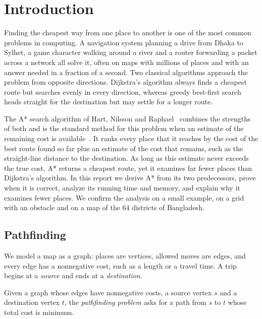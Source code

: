\section{Introduction}\label{sec:intro}

Finding the cheapest way from one place to another is one of the most common
problems in computing. A navigation system planning a drive from Dhaka to
Sylhet, a game character walking around a river and a router forwarding a
packet across a network all solve it, often on maps with millions of places and
with an answer needed in a fraction of a second. Two classical algorithms
approach the problem from opposite directions. Dijkstra's algorithm always finds
a cheapest route but searches evenly in every direction, whereas greedy
best-first search heads straight for the destination but may settle for a
longer route.

The A* search algorithm of Hart, Nilsson and Raphael~\cite{hart1968formal}
combines the strengths of both and is the standard method for this problem when
an estimate of the remaining cost is available~\cite{russell2020aima}. It ranks
every place that it reaches by the cost of the best route found so far plus an
estimate of the cost that remains, such as the straight-line distance to the
destination. As long as this estimate never exceeds the true cost, A* returns a
cheapest route, yet it examines far fewer places than Dijkstra's algorithm. In
this report we derive A* from its two predecessors, prove when it is correct,
analyze its running time and memory, and explain why it examines fewer places.
We confirm the analysis on a small example, on a grid with an obstacle and on a
map of the 64 districts of Bangladesh.

\subsection{Pathfinding}\label{sec:pathfinding}

We model a map as a graph: places are vertices, allowed moves are edges, and
every edge has a nonnegative cost, such as a length or a travel time. A trip
begins at a \emph{source} and ends at a \emph{destination}.

\begin{definition}\label{def:pathfinding}
Given a graph whose edges have nonnegative costs, a source vertex $s$ and a
destination vertex $t$, the \emph{pathfinding problem} asks for a path from $s$
to $t$ whose total cost is minimum.
\end{definition}


